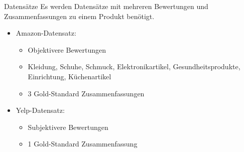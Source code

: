 

\begin{frame}{Datensätze}
  Es werden Datensätze mit mehreren Bewertungen und Zusammenfassungen zu einem Produkt benötigt.
  \begin{itemize}   
      \item Amazon-Datensatz: \begin{itemize}
        \item Objektivere Bewertungen
        \item Kleidung, Schuhe, Schmuck, Elektronikartikel, Gesundheitsprodukte, Einrichtung, Küchenartikel
        \item 3 Gold-Standard Zusammenfassungen
      \end{itemize}
      \item Yelp-Datensatz: \begin{itemize}
        \item Subjektivere Bewertungen
        \item 1 Gold-Standard Zusammenfassung
      \end{itemize}
  \end{itemize}

  \begin{table}[!h]
    \centering

    \end{table}
\end{frame}


